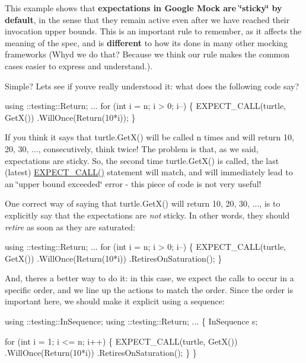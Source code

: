 This example shows that {\bfseries expectations in Google Mock are \char`\"{}sticky\char`\"{} by default}, in the sense that they remain active even after we have reached their invocation upper bounds. This is an important rule to remember, as it affects the meaning of the spec, and is {\bfseries different} to how it\textquotesingle{}s done in many other mocking frameworks (Why\textquotesingle{}d we do that? Because we think our rule makes the common cases easier to express and understand.).

Simple? Let\textquotesingle{}s see if you\textquotesingle{}ve really understood it\+: what does the following code say?


\begin{DoxyCode}
using ::testing::Return;
...
for (int i = n; i > 0; i--) \{
  EXPECT\_CALL(turtle, GetX())
      .WillOnce(Return(10*i));
\}
\end{DoxyCode}


If you think it says that {\ttfamily turtle.\+Get\+X()} will be called {\ttfamily n} times and will return 10, 20, 30, ..., consecutively, think twice! The problem is that, as we said, expectations are sticky. So, the second time {\ttfamily turtle.\+Get\+X()} is called, the last (latest) {\ttfamily \hyperlink{gmock-spec-builders_8h_a535a6156de72c1a2e25a127e38ee5232}{E\+X\+P\+E\+C\+T\+\_\+\+C\+A\+L\+L()}} statement will match, and will immediately lead to an \char`\"{}upper bound exceeded\char`\"{} error -\/ this piece of code is not very useful!

One correct way of saying that {\ttfamily turtle.\+Get\+X()} will return 10, 20, 30, ..., is to explicitly say that the expectations are {\itshape not} sticky. In other words, they should {\itshape retire} as soon as they are saturated\+:


\begin{DoxyCode}
using ::testing::Return;
...
for (int i = n; i > 0; i--) \{
  EXPECT\_CALL(turtle, GetX())
    .WillOnce(Return(10*i))
    .RetiresOnSaturation();
\}
\end{DoxyCode}


And, there\textquotesingle{}s a better way to do it\+: in this case, we expect the calls to occur in a specific order, and we line up the actions to match the order. Since the order is important here, we should make it explicit using a sequence\+:


\begin{DoxyCode}
using ::testing::InSequence;
using ::testing::Return;
...
\{
  InSequence s;

  for (int i = 1; i <= n; i++) \{
    EXPECT\_CALL(turtle, GetX())
        .WillOnce(Return(10*i))
        .RetiresOnSaturation();
  \}
\}
\end{DoxyCode}



